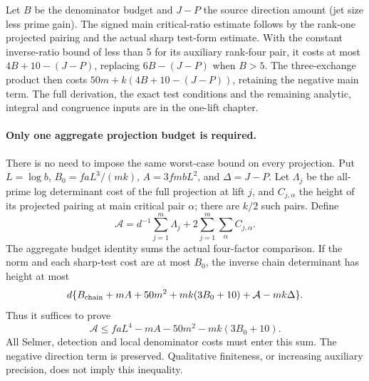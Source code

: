 Let \(B\) be the denominator budget and \(J-P\) the source
direction amount (jet size less prime gain).
The signed main critical-ratio estimate follows by the
rank-one projected pairing and the actual sharp test-form
estimate. With the constant inverse-ratio bound of less
than 5 for its auxiliary rank-four pair, it costs at most
\(4B+10-(J-P)\), replacing \(6B-(J-P)\) when \(B>5\).
The three-exchange product then costs
\(50m+k(4B+10-(J-P))\), retaining the negative main term.
The full derivation, the exact test conditions and the
remaining analytic, integral and congruence inputs are in
the one-lift chapter.

\paragraph{Only one aggregate projection budget is required.}
There is no need to impose the same worst-case bound on every
projection. Put \(L=\log b\), \(B_0=faL^3/(mk)\),
\(A=3fmbL^2\), and \(\Delta=J-P\). Let \(\Lambda_j\) be the
all-prime log determinant cost of the full projection at lift \(j\),
and \(C_{j,\alpha}\) the height of its projected pairing at main
critical pair \(\alpha\); there are \(k/2\) such pairs. Define
\[
 \mathcal A=d^{-1}\sum_{j=1}^m\Lambda_j
       +2\sum_{j=1}^m\sum_{\alpha}C_{j,\alpha}.
\]
The 
{aggregate budget identity} sums the actual four-factor comparison.
If the norm and each sharp-test cost are at most \(B_0\), the inverse
chain determinant has height at most
\[
 d\{B_{\rm chain}+mA+50m^2+mk(3B_0+10)
                      +\mathcal A-mk\Delta\}.
\]
Thus it suffices to prove
\[
 \mathcal A\le faL^4-mA-50m^2-mk(3B_0+10).
\]
All Selmer, detection and local denominator costs must enter this sum.
The negative direction term is preserved. Qualitative finiteness, or
increasing auxiliary precision, does not imply this inequality.

